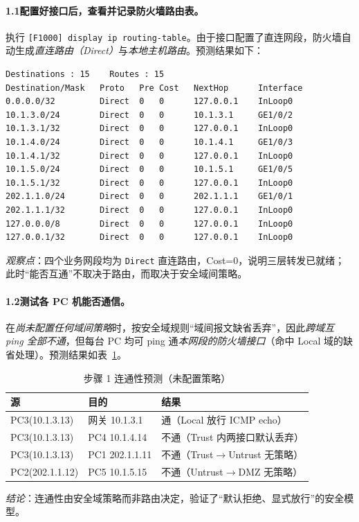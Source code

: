 \documentclass[12pt,a4paper]{article}
\begin{document}
\paragraph{1.1\quad 配置好接口后，查看并记录防火墙路由表。}
执行 \texttt{[F1000] display ip routing-table}。由于接口配置了直连网段，防火墙自动生成\emph{直连路由（Direct）}与\emph{本地主机路由}。预测结果如下：
\begin{lstlisting}[basicstyle=\ttfamily\scriptsize]
Destinations : 15    Routes : 15
Destination/Mask   Proto   Pre Cost   NextHop      Interface
0.0.0.0/32         Direct  0   0      127.0.0.1    InLoop0
10.1.3.0/24        Direct  0   0      10.1.3.1     GE1/0/2
10.1.3.1/32        Direct  0   0      127.0.0.1    InLoop0
10.1.4.0/24        Direct  0   0      10.1.4.1     GE1/0/3
10.1.4.1/32        Direct  0   0      127.0.0.1    InLoop0
10.1.5.0/24        Direct  0   0      10.1.5.1     GE1/0/5
10.1.5.1/32        Direct  0   0      127.0.0.1    InLoop0
202.1.1.0/24       Direct  0   0      202.1.1.1    GE1/0/1
202.1.1.1/32       Direct  0   0      127.0.0.1    InLoop0
127.0.0.0/8        Direct  0   0      127.0.0.1    InLoop0
127.0.0.1/32       Direct  0   0      127.0.0.1    InLoop0
\end{lstlisting}
\emph{观察点}：四个业务网段均为 \texttt{Direct} 直连路由，Cost=0，说明三层转发已就绪；此时“能否互通”不取决于路由，而取决于安全域间策略。

\paragraph{1.2\quad 测试各 PC 机能否通信。}
在\emph{尚未配置任何域间策略}时，按安全域规则“域间报文缺省丢弃”，因此\emph{跨域互 ping 全部不通}，但每台 PC 均可 ping 通\emph{本网段的防火墙接口}（命中 Local 域的缺省处理）。预测结果如表~\ref{tab:ping1}。
\begin{table}[H]
\centering\caption{步骤 1 连通性预测（未配置策略）}\label{tab:ping1}
\small
\begin{tabular}{@{}lll@{}}
\toprule
源 & 目的 & 结果 \\
\midrule
PC3(10.1.3.13) & 网关 10.1.3.1 & 通（Local 放行 ICMP echo） \\
PC3(10.1.3.13) & PC4 10.1.4.14 & 不通（Trust 内两接口默认丢弃） \\
PC3(10.1.3.13) & PC1 202.1.1.11 & 不通（Trust$\to$Untrust 无策略） \\
PC2(202.1.1.12)& PC5 10.1.5.15 & 不通（Untrust$\to$DMZ 无策略） \\
\bottomrule
\end{tabular}
\end{table}
\emph{结论}：连通性由安全域策略而非路由决定，验证了“默认拒绝、显式放行”的安全模型。
\end{document}
